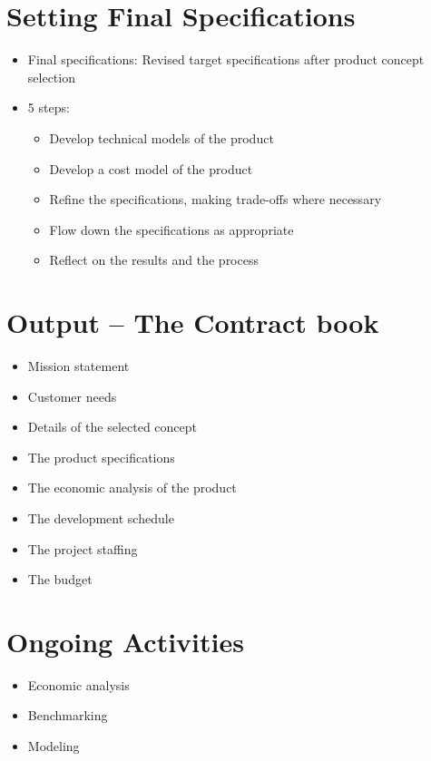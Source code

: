 \documentclass[openany,12pt,a4paper]{book}
\begin{document}
\section{Setting Final Specifications}
\begin{itemize}
    \item Final specifications: Revised target specifications after product concept selection
    \item 5 steps:
    \begin{itemize}
        \item Develop technical models of the product
        \item Develop a cost model of the product
        \item Refine the specifications, making trade-offs where necessary
        \item Flow down the specifications as appropriate
        \item Reflect on the results and the process
    \end{itemize}
\end{itemize}

\section{Output -- The Contract book}
\begin{itemize}
    \item Mission statement
    \item Customer needs
    \item Details of the selected concept
    \item The product specifications
    \item The economic analysis of the product
    \item The development schedule
    \item The project staffing
    \item The budget
\end{itemize}

\section{Ongoing Activities}
\begin{itemize}
    \item Economic analysis
    \item Benchmarking
    \item Modeling
\end{itemize}
\end{document}
